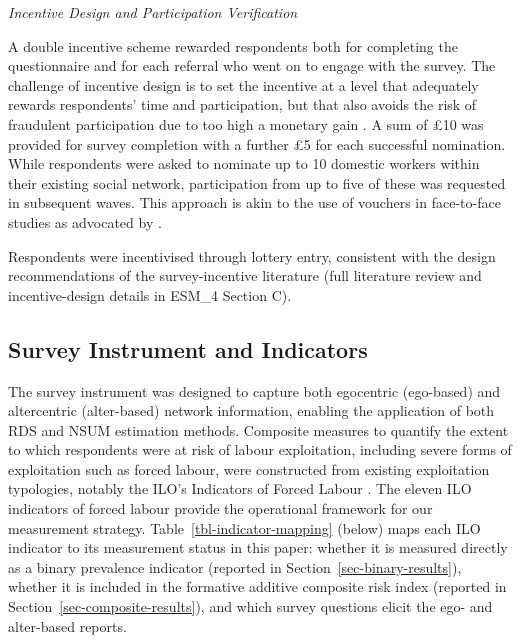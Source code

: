 \documentclass[
  12pt,
  letterpaper,
  DIV=11,
  numbers=noendperiod]{scrartcl}
\begin{document}
\emph{Incentive Design and Participation Verification}

A double incentive scheme rewarded respondents both for completing the
questionnaire and for each referral who went on to engage with the
survey. The challenge of incentive design is to set the incentive at a
level that adequately rewards respondents' time and participation, but
that also avoids the risk of fraudulent participation due to too high a
monetary gain \autocite{jord20-overcoming}. A sum of £10 was provided
for survey completion with a further £5 for each successful nomination.
While respondents were asked to nominate up to 10 domestic workers
within their existing social network, participation from up to five of
these was requested in subsequent waves. This approach is akin to the
use of vouchers in face-to-face studies as advocated by
\textcite{thompson_new_2020}.

Respondents were incentivised through lottery entry, consistent with the
design recommendations of the survey-incentive literature (full
literature review and incentive-design details in ESM\_4 Section C).

\subsection{Survey Instrument and
Indicators}\label{sec-survey-instrument}

The survey instrument was designed to capture both egocentric
(ego-based) and altercentric (alter-based) network information, enabling
the application of both RDS and NSUM estimation methods. Composite
measures to quantify the extent to which respondents were at risk of
labour exploitation, including severe forms of exploitation such as
forced labour, were constructed from existing exploitation typologies,
notably the ILO's Indicators of Forced Labour
\autocite{ILO11-indicators}. The eleven ILO indicators of forced labour
\autocite{ILO11-indicators,international_labour_organization_global_2017}
provide the operational framework for our measurement strategy.
Table~\ref{tbl-indicator-mapping} (below) maps each ILO indicator to its
measurement status in this paper: whether it is measured directly as a
binary prevalence indicator (reported in
Section~\ref{sec-binary-results}), whether it is included in the
formative additive composite risk index (reported in
Section~\ref{sec-composite-results}), and which survey questions elicit
the ego- and alter-based reports.
\end{document}
